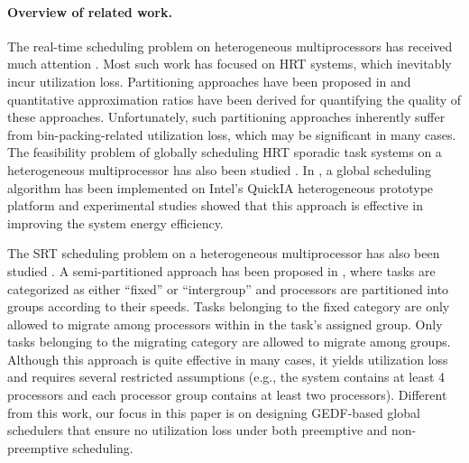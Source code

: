 \documentclass[Times, 10pt,twocolumn]{article}
\theoremstyle{definition}
\begin{document}
\paragraph{Overview of related work.} The real-time scheduling problem on heterogeneous multiprocessors has received much attention \cite{baruah2011partitioned, kumar2004single, andersson2010assigning, baruah2005partitioned, funk2005task, funk2001line, liu2012power}. Most such work has focused on HRT systems, which inevitably incur utilization loss. Partitioning approaches have been proposed in \cite{baruah2004feasibility, baruah2011partitioned, baruah2005partitioned, funk2005task, funk2001line, liu2012power, andersson2010assigning} and quantitative approximation ratios have been derived for quantifying the quality of these approaches. Unfortunately, such partitioning approaches inherently suffer from bin-packing-related utilization loss, which may be significant in many cases. The feasibility problem of globally scheduling HRT sporadic task systems on a heterogeneous multiprocessor has also been studied \cite{baruah2004feasibility}. In \cite{cong2012energy}, a global scheduling algorithm has been implemented on Intel's QuickIA heterogeneous prototype platform and experimental studies showed that this approach is effective in improving the system energy efficiency.



The SRT scheduling problem on a heterogeneous multiprocessor has also been studied  \cite{leontyev2007tardiness}. A semi-partitioned approach has been proposed in \cite{leontyev2007tardiness}, where tasks are categorized as either ``fixed'' or ``intergroup'' and processors are partitioned into groups according to their speeds. Tasks belonging to the fixed category are only allowed to migrate among processors within in the task's assigned group. Only tasks belonging to the migrating category are allowed to migrate among groups. Although this approach is quite effective in many cases, it yields utilization loss and requires several restricted assumptions (e.g., the system contains at least 4 processors and each processor group contains at least two processors). Different from this work, our focus in this paper is on designing GEDF-based global schedulers that ensure no utilization loss under both preemptive and non-preemptive scheduling.
\end{document}
